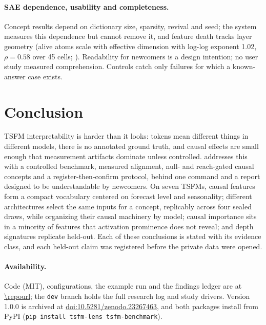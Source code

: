 \paragraph{SAE dependence, usability and completeness.} Concept results depend on dictionary size, sparsity,
revival and seed; the system measures this dependence but cannot remove it, and feature death tracks layer
geometry (alive atoms scale with effective dimension with log-log exponent 1.02, $\rho=0.58$ over 45 cells;
). Readability for newcomers is a design intention; no user study measured comprehension. Controls catch only failures
for which a known-answer case exists.

\section{Conclusion}
\label{sec:conclusion}

TSFM interpretability is harder than it looks: tokens mean different things in different models, there is no
annotated ground truth, and causal effects are small enough that measurement artifacts dominate unless controlled.
\tool{} addresses this with a controlled benchmark, measured alignment, null- and reach-gated causal concepts and a
register-then-confirm protocol, behind one command and a report designed to be understandable by newcomers. On seven
TSFMs, causal features form a compact vocabulary centered on forecast level and seasonality; different architectures
select the same inputs for a concept, replicably across four sealed draws, while organizing their causal machinery by
model; causal importance sits in a minority of features that activation prominence does not reveal; and depth
signatures replicate held-out. Each of these conclusions is stated with its evidence class, and each held-out claim
was registered before the private data were opened.

\paragraph{Availability.} Code (MIT), configurations, the example run and the findings ledger are at
\url{\repourl}; the \texttt{dev} branch holds the full research log and study drivers. Version 1.0.0 is archived at
\href{https://doi.org/10.5281/zenodo.23267463}{doi:10.5281/zenodo.23267463}, and both packages install from PyPI (\texttt{pip install tsfm-lens tsfm-benchmark}).
